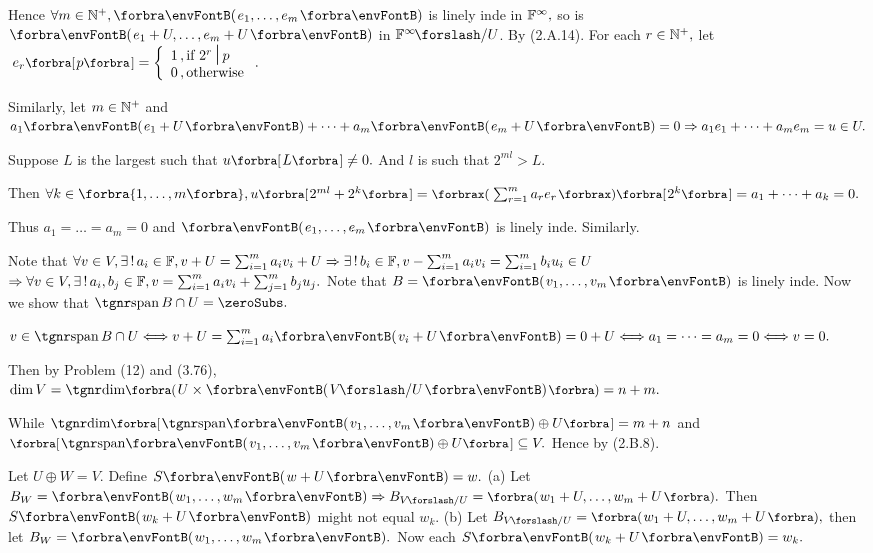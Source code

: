 Hence $\forall m\in\Nbp,\Par{e_1,\dots,e_m}$ is linely inde in ${\mathbb{F}}^{\infty},$ so is $\Par{e_1+U,\dots,e_m+U}$ in $\Fbb^{\infty}\XSlash U$. By (2.A.14).\PfEnd\vspace{14pt}\quad
\Or For each $r\in{\mathbb{N}^+},$ let $\;e_r\Sbra{p}=\hMath[0pt]{l}{\left\{}{\right.}{1\,,\text{if }2^r\,\mmid\,p\\0\,,\text{otherwise}}.$\vspace{4pt}\par\quad
Similarly, let $m\in{\mathbb{N}^+}$ and $a_1\Par{e_1+U}+\dots+a_m\Par{e_m+U}=0\Rightarrow a_1e_1+\dots+a_me_m=u\in U.$\vspace{4pt}\par\quad
Suppose $L$ is the largest such that $u\Sbra{L}\neq 0.$ And $l$ is such that $2^{ml}> L.$\vspace{6pt}\par\quad
Then $\forall k\in\Bra{1,\dots,m},u\Sbra{2^{ml}+2^k}=\XPar{\sum_{r=1}^m a_re_r}\Sbra{2^k}=a_1+\dots+a_k=0.$\vspace{6pt}\par\quad
Thus $a_1=\dots=a_m=0$ and $\Par{e_1,\dots,e_m}$ is linely inde. Similarly.\PfEnd
\SepLine\pagebreak

Note that $\forall v\in V,\exists\,!\,a_i\in{\mathbb{F}},v+U=\sum_{i=1}^m a_i v_i+U\Rightarrow\exists\,!\,b_i\in{\mathbb{F}},v-\sum_{i=1}^m a_i v_i=\sum_{i=1}^m b_i u_i\in U$\parSol{}
 $\Rightarrow \forall v\in V,\exists\,!\,a_i,b_j\in{\mathbb{F}},v=\sum_{i=1}^m a_i v_i+\sum_{j=1}^m b_j u_j.$\PfEnd\vspace{4pt}\quad
\Or Note that $B=\Par{v_1,\dots,v_m}$ is linely inde. Now we show that $\Spn B\cap U=\zeroSubs.$\par\quad
$v\in\Spn B\cap U\Longleftrightarrow v+U=\sum_{i=1}^ma_i\Par{v_i+U}=0+U\Longleftrightarrow a_1=\dots=a_m=0\Longleftrightarrow v=0.$\par\quad
Then by Problem (12) and (3.76), $\dim V=\Dim\BigPar{U\times\Par{V\XSlash U}}=n+m.$\par\quad
While $\Dim\Sbra{\Span{v_1,\dots,v_m}\oplus U}=m+n$ and $\Sbra{\Span{v_1,\dots,v_m}\oplus U}\subseteq V.$ \;Hence by ({2.B.8}).\PfEnd
\SepLine

\BulletPointX{}\;\;Let $U\oplus W=V.$ Define $S\Par{w+U}=w.$ \;\TextB{}
(a) Let $B_W=\Par{w_1,\dots,w_m}\Rightarrow B_{V\XSlash U}=\BigPar{w_1+U,\dots,w_m+U}.$ Then $S\Par{w_k+U}$ might not equal $w_k.$\TextB{}
(b) Let $B_{V\XSlash U}=\BigPar{w_1+U,\dots,w_m+U},$ then let $B_W=\Par{w_1,\dots,w_m}.$ Now each $S\Par{w_k+U}=w_k.$ 
\SepLine

